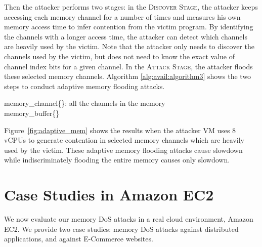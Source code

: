 \documentclass{sig-alternate}
\newcommand{\attackname}{memory DoS attacks\xspace}
\begin{document}
Then the attacker performs two stages: in the \textsc{Discover Stage}, the attacker keeps accessing each memory channel for a number of times and measures his own memory access time to infer contention from the victim program. By identifying the channels with a longer access time, the attacker can detect which channels are heavily used by the victim.  Note that the attacker only needs to discover the channels used by the victim, but does not need to know the exact value of channel index bits for a given channel. In the \textsc{Attack Stage}, the attacker floods these selected memory channels. Algorithm \ref{alg:avail:algorithm3} shows the two steps to conduct adaptive memory flooding attacks. 

\begin{algorithm}[t]
\scriptsize
\SetAlgoLined
 \KwIn{}
 \Indp 
   memory\_channel\{\}: all the channels in the memory \\
         memory\_buffer\{\} \\
\Indm
{}
 \caption{Adaptive memory flooding}
  \label{alg:avail:algorithm3}
\end{algorithm}


Figure~\ref{fig:adaptive_mem} shows the results when the attacker VM uses 8 vCPUs to generate contention in selected memory channels which are heavily used by the victim. These adaptive memory flooding attacks cause  slowdown while indiscriminately flooding the entire memory causes only  slowdown.

\section{Case Studies in Amazon EC2}
\label{sec:ec2}

We now evaluate our \attackname in a real cloud environment, Amazon EC2. We 
provide two case studies: \attackname against distributed applications, and 
against E-Commerce websites. 
\end{document}
